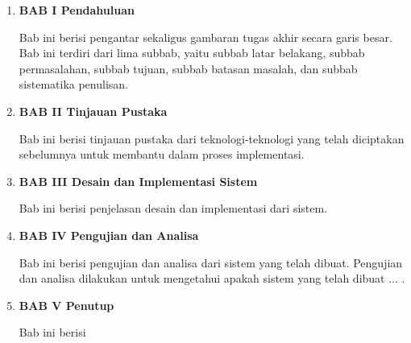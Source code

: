 \begin{enumerate}[nolistsep]

  \item \textbf{BAB I Pendahuluan}

        Bab ini berisi pengantar sekaligus gambaran tugas akhir
        secara garis besar. Bab ini terdiri dari lima subbab, yaitu subbab
        latar belakang, subbab permasalahan, subbab tujuan, subbab batasan
        masalah, dan subbab sistematika penulisan.

        \vspace{2ex}

  \item \textbf{BAB II Tinjauan Pustaka}

        Bab ini berisi tinjauan pustaka dari teknologi-teknologi
        yang telah diciptakan sebelumnya untuk membantu dalam proses
        implementasi.

        \vspace{2ex}

  \item \textbf{BAB III Desain dan Implementasi Sistem}

        Bab ini berisi penjelasan desain dan implementasi dari sistem.

        \vspace{2ex}

  \item \textbf{BAB IV Pengujian dan Analisa}

        Bab ini berisi pengujian dan analisa dari sistem yang telah dibuat.
        Pengujian dan analisa dilakukan untuk mengetahui apakah sistem yang
        telah dibuat ... .

        \vspace{2ex}

  \item \textbf{BAB V Penutup}

        Bab ini berisi

\end{enumerate}
